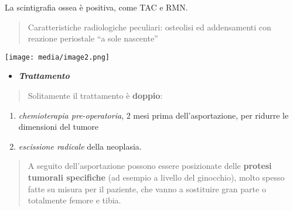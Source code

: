 \documentclass[]{article}
\begin{document}
La scintigrafia ossea è positiva, come TAC e RMN.

\begin{quote}
Caratteristiche radiologiche peculiari: osteolisi ed addensamenti con
reazione periostale ``a sole nascente''
\end{quote}

\texttt{[image: media/image2.png]}

\begin{itemize}
\item
  \textbf{\emph{Trattamento}}
\end{itemize}

\begin{quote}
Solitamente il trattamento è \textbf{doppio}:
\end{quote}

\begin{enumerate}
\def\labelenumi{\arabic{enumi}.}
\item
  \emph{chemioterapia pre-operatoria}, 2 mesi prima dell'asportazione,
  per ridurre le dimensioni del tumore
\item
  \emph{escissione radicale} della neoplasia.
\end{enumerate}

\begin{quote}
A seguito dell'asportazione possono essere posizionate delle
\textbf{protesi tumorali specifiche} (ad esempio a livello del
ginocchio), molto spesso fatte su misura per il paziente, che vanno a
sostituire gran parte o totalmente femore e tibia.
\end{quote}
\end{document}
